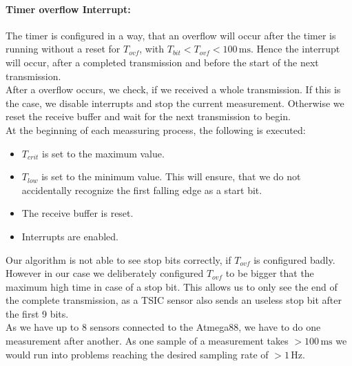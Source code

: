 \documentclass[a4paper]{scrreprt}
\begin{document}
\paragraph{Timer overflow Interrupt:} The timer is configured in a way, that an overflow will occur after
the timer is running without a reset for $T_{ovf}$, with $T_{bit} < T_{ovf} < 100\,\mathrm{ms}$. Hence
the interrupt will occur, after a completed transmission and before the start of the next transmission.\\
After a overflow occurs, we check, if we received a whole transmission. If this is the case, we disable
interrupts and stop the current measurement. Otherwise we reset the receive buffer and wait for the
next transmission to begin.
\\[0.6cm]
At the beginning of each meassuring process, the following is executed:
\begin{itemize}
	\item $T_{crit}$ is set to the maximum value.
	\item $T_{low}$ is set to the minimum value. This will ensure, that we do not
		accidentally recognize the first falling edge as a start bit.
	\item The receive buffer is reset.
	\item Interrupts are enabled.
\end{itemize}
Our algorithm is not able to see stop bits correctly, if $T_{ovf}$ is configured badly.
However in our case we deliberately configured $T_{ovf}$ to be bigger that the maximum
high time in case of a stop bit.
This allows us to only see the end of the complete transmission, as a TSIC sensor also
sends an useless stop bit after the first 9 bits.\\
As we have up to 8 sensors connected to the Atmega88, we have to do one measurement after another.
As one sample of a measurement takes $>100\,\mathrm{ms}$ we would run
into problems reaching the desired sampling rate of $>1\,\mathrm{Hz}$.
\end{document}
